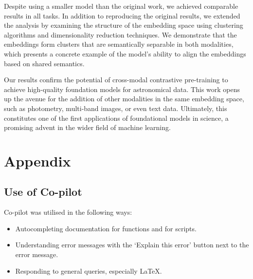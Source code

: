 \documentclass[draft, a4paper,12pt]{article}
\begin{document}
Despite using a smaller model than the original work, we achieved comparable results in all tasks. In addition to reproducing the original results, we extended the analysis by examining the structure of the embedding space using clustering algorithms and dimensionality reduction techniques. We demonstrate that the embeddings form clusters that are semantically separable in both modalities, which presents a concrete example of the model's ability to align the embeddings based on shared semantics. 


Our results confirm the potential of cross-modal contrastive pre-training to achieve high-quality foundation models for astronomical data. This work opens up the avenue for the addition of other modalities in the same embedding space, such as photometry, multi-band images, or even text data. Ultimately, this constitutes one of the first applications of foundational models in science, a promising advent in the wider field of machine learning.





\newpage



\newpage
\section*{Appendix}

\subsection*{Use of Co-pilot}
Co-pilot was utilised in the following ways:
\begin{itemize}
    \item Autocompleting documentation for functions and for scripts.
    \item Understanding error messages with the `Explain this error' button next to the error message.
    \item Responding to general queries, especially LaTeX.
\end{itemize}
\end{document}
